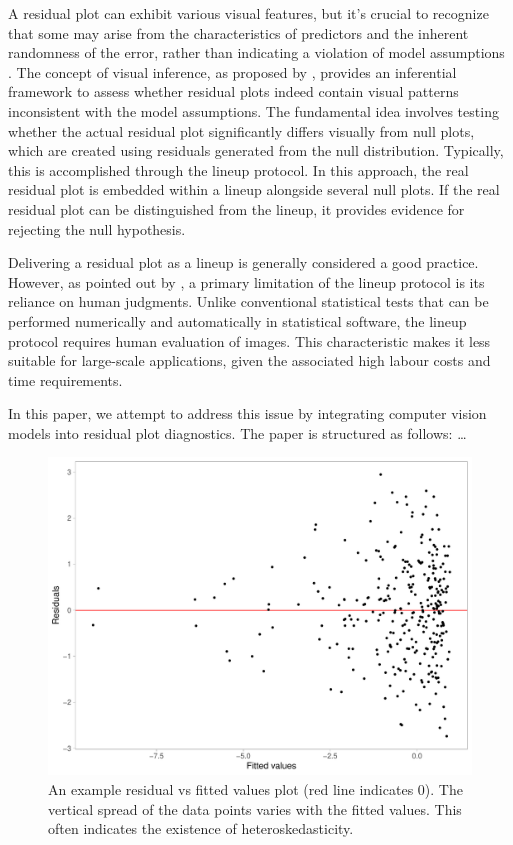 \documentclass[]{interact}
\theoremstyle{plain}%
\theoremstyle{definition}
\theoremstyle{remark}
\begin{document}
A residual plot can exhibit various visual features, but it's crucial to
recognize that some may arise from the characteristics of predictors and
the inherent randomness of the error, rather than indicating a violation
of model assumptions \citep{li2023plot}. The concept of visual
inference, as proposed by \citet{buja2009statistical}, provides an
inferential framework to assess whether residual plots indeed contain
visual patterns inconsistent with the model assumptions. The fundamental
idea involves testing whether the actual residual plot significantly
differs visually from null plots, which are created using residuals
generated from the null distribution. Typically, this is accomplished
through the lineup protocol. In this approach, the real residual plot is
embedded within a lineup alongside several null plots. If the real
residual plot can be distinguished from the lineup, it provides evidence
for rejecting the null hypothesis.

Delivering a residual plot as a lineup is generally considered a good
practice. However, as pointed out by \citet{li2023plot}, a primary
limitation of the lineup protocol is its reliance on human judgments.
Unlike conventional statistical tests that can be performed numerically
and automatically in statistical software, the lineup protocol requires
human evaluation of images. This characteristic makes it less suitable
for large-scale applications, given the associated high labour costs and
time requirements.

In this paper, we attempt to address this issue by integrating computer
vision models into residual plot diagnostics. The paper is structured as
follows: \ldots{}

\begin{figure}

{\centering \includegraphics[width=1\linewidth]{paper_files/figure-latex/false-finding-1} 

}

\caption{An example residual vs fitted values plot (red line indicates 0). The vertical spread of the data points varies with the fitted values. This often indicates the existence of heteroskedasticity.}\label{fig:false-finding}
\end{figure}
\end{document}
